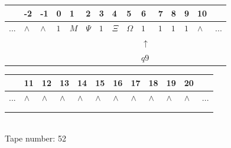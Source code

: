 \documentclass[11pt]{article}
\begin{document}
\begin{table}[H]
\centering
\begin{tabular}{lllllllllllllll}
 & -2 & -1 & 0 & 1 & 2 & 3 & 4 & 5 & 6 & 7 & 8 & 9 & 10 & \\
\hline
$...$ & \multicolumn{1}{|l|}{$\wedge$} & \multicolumn{1}{|l|}{$\wedge$} & \multicolumn{1}{|l|}{$1$} & \multicolumn{1}{|l|}{$M$} & \multicolumn{1}{|l|}{$\Psi$} & \multicolumn{1}{|l|}{$1$} & \multicolumn{1}{|l|}{$\Xi$} & \multicolumn{1}{|l|}{$\Omega$} & \multicolumn{1}{|l|}{$1$} & \multicolumn{1}{|l|}{$1$} & \multicolumn{1}{|l|}{$1$} & \multicolumn{1}{|l|}{$1$} & \multicolumn{1}{|l|}{$\wedge$} & $...$\\
\hline
&  &  &  &  &  &  &  &  & $\uparrow$ &  &  &  &  &  \\
&  &  &  &  &  &  &  &  & $ q9 $ &  &  &  &  &  \\
\end{tabular}
\begin{tabular}{llllllllllll}
 & 11 & 12 & 13 & 14 & 15 & 16 & 17 & 18 & 19 & 20 & \\
\hline
$...$ & \multicolumn{1}{|l|}{$\wedge$} & \multicolumn{1}{|l|}{$\wedge$} & \multicolumn{1}{|l|}{$\wedge$} & \multicolumn{1}{|l|}{$\wedge$} & \multicolumn{1}{|l|}{$\wedge$} & \multicolumn{1}{|l|}{$\wedge$} & \multicolumn{1}{|l|}{$\wedge$} & \multicolumn{1}{|l|}{$\wedge$} & \multicolumn{1}{|l|}{$\wedge$} & \multicolumn{1}{|l|}{$\wedge$} & $...$\\
\hline
&  &  &  &  &  &  &  &  &  &  &  \\
&  &  &  &  &  &  &  &  &  &  &  \\
\end{tabular}
\\
Tape number: 52
\noindent\makebox[\linewidth]{\hdashrule{\textwidth}{1pt}{1pt}}\end{table}
\end{document}
